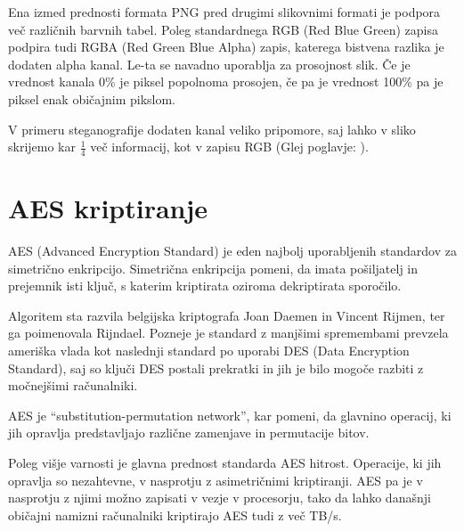 \documentclass[a4paper, 12pt]{article}
\begin{document}
        Ena izmed prednosti formata PNG pred drugimi slikovnimi formati je podpora več različnih barvnih tabel. Poleg standardnega RGB (Red Blue Green) zapisa podpira tudi RGBA (Red Green Blue Alpha) zapis, katerega bistvena razlika je dodaten alpha kanal. Le-ta se navadno uporablja za prosojnost slik. Če je vrednost kanala 0\% je piksel popolnoma prosojen, če pa je vrednost 100\% pa je piksel enak običajnim pikslom.

        V primeru steganografije dodaten kanal veliko pripomore, saj lahko v sliko skrijemo kar $\frac{1}{4}$ več informacij, kot v zapisu RGB (Glej poglavje: ).


\section{AES kriptiranje}
    AES (Advanced Encryption Standard) je eden najbolj uporabljenih standardov za simetrično enkripcijo. Simetrična enkripcija pomeni, da imata pošiljatelj in prejemnik isti ključ, s katerim kriptirata oziroma dekriptirata sporočilo. 

    Algoritem sta razvila belgijska kriptografa Joan Daemen in Vincent Rijmen, ter ga poimenovala Rijndael. Pozneje je standard z manjšimi spremembami prevzela ameriška vlada kot naslednji standard po uporabi DES (Data Encryption Standard), saj so ključi DES postali prekratki in jih je bilo mogoče razbiti z močnejšimi računalniki.

    AES je ``substitution-permutation network'', kar pomeni, da glavnino operacij, ki jih opravlja predstavljajo različne zamenjave in permutacije bitov.   

    Poleg višje varnosti je glavna prednost standarda AES hitrost. Operacije, ki jih opravlja so nezahtevne, v nasprotju z asimetričnimi kriptiranji. AES pa je v nasprotju z njimi možno zapisati v vezje v procesorju, tako da lahko današnji običajni namizni računalniki kriptirajo AES tudi z več TB/s.
\end{document}
